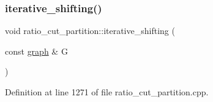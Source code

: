 \mbox{\label{classratio__cut__partition_a758382177ff8be996d0be78a3cca069b}} 
\subsubsection{\texorpdfstring{iterative\+\_\+shifting()}{iterative\_shifting()}}
{\footnotesize\ttfamily void ratio\+\_\+cut\+\_\+partition\+::iterative\+\_\+shifting (\begin{DoxyParamCaption}\item[{const \mbox{\hyperlink{classgraph}{graph}} \&}]{G }\end{DoxyParamCaption})\hspace{0.3cm}{\ttfamily [protected]}}



Definition at line 1271 of file ratio\+\_\+cut\+\_\+partition.\+cpp.


